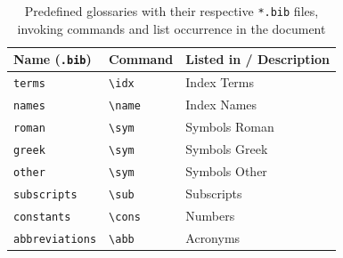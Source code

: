 \begin{table}[tbp]
    \caption[Predefined glossaries]{%
        Predefined glossaries with their respective \texttt{*.bib} files,
        invoking commands and list occurrence in the document%
    }
    \label{tab:available_bib_files}
    \centering
    \small
    \begin{tabular}{%
            @{}
            *3{l}%
            @{}
        }
        \toprule
        Name (\texttt{.bib})               & Command                      & Listed in / Description       \\
        \midrule
        \texttt{terms}                     & \texttt{\textbackslash idx}  & Index \textrightarrow{} Terms \\
        \texttt{names}                     & \texttt{\textbackslash name} & Index \textrightarrow{} Names \\
        \addlinespace
        \texttt{roman}                     &
        \texttt{\textbackslash sym}        &
        \nameref{ch:glossary} \textrightarrow{} Symbols \textrightarrow{} Roman                           \\
        \texttt{greek}                     &
        \texttt{\textbackslash sym}        &
        \nameref{ch:glossary} \textrightarrow{} Symbols \textrightarrow{} Greek                           \\
        \texttt{other}                     &
        \texttt{\textbackslash sym}        &
        \nameref{ch:glossary} \textrightarrow{} Symbols \textrightarrow{} Other                           \\
        \addlinespace
        \texttt{subscripts}                &
        \texttt{\textbackslash sub}        &
        \nameref{ch:glossary} \textrightarrow{} Subscripts                                                \\
        \addlinespace
        \texttt{constants}\footnotemark[1] &
        \texttt{\textbackslash cons}       &
        \nameref{ch:glossary} \textrightarrow{} Numbers                                                   \\
        \addlinespace
        \texttt{abbreviations}             &
        \texttt{\textbackslash abb}        &
        \nameref{ch:glossary} \textrightarrow{} Acronyms                                                  \\
        \bottomrule
    \end{tabular}
\end{table}
